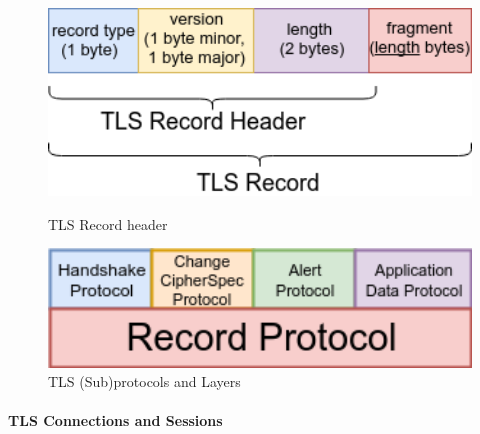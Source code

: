 \documentclass{llncs}
\begin{document}
\begin{figure}
    \centering
    \begin{minipage}{0.5\textwidth}
        \centering
        \includegraphics[width=1.0\textwidth]{img/record-header-3.png} %
        \caption{\label{fig:tls-record-header} TLS Record header}
    \end{minipage}\hfill
    \begin{minipage}{0.47\textwidth}
        \centering
        \includegraphics[width=1.0\textwidth]{img/tls-sub-protocols-3.png} %
        \caption{\label{fig:tls-subprotocols} TLS (Sub)protocols and Layers}
    \end{minipage}
\end{figure}

\paragraph{TLS Connections and Sessions}
\end{document}
